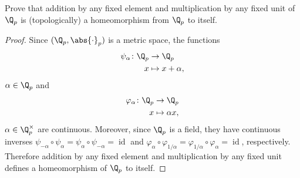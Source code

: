 \documentclass[10pt]{amsart}
\begin{document}
\setcounter{thm}{5}
\begin{thm}
  Prove that addition by any fixed element and multiplication by any fixed unit of $\Q_p$ is (topologically)
  a homeomorphism from $\Q_p$ to itself.
  \begin{proof}
    Since $(\Q_p, \abs{\cdot}_p)$ is a metric space, the functions 
    \begin{align*}
      \psi_\alpha \colon \Q_p &\rightarrow \Q_p\\
      x &\mapsto x + \alpha,
    \end{align*}
     $\alpha \in \Q_p$ and 
    \begin{align*}
      \varphi_\alpha \colon \Q_p &\rightarrow \Q_p\\
      x &\mapsto \alpha x,
    \end{align*}
    $\alpha \in \Q_p^\times$ are continuous.
    Moreover, since $\Q_p$ is a field, they have continuous inverses $\psi_{-\alpha} \circ \psi_{\alpha} = \psi_{\alpha} \circ \psi_{-\alpha} = \operatorname{id}$ and $\varphi_{\alpha} \circ \varphi_{1/\alpha} = \varphi_{1/\alpha} \circ \varphi_{\alpha} = \operatorname{id}$, respectively.
    Therefore addition by any fixed element and multiplication by any fixed unit defines a homeomorphism of $\Q_p$ to itself.
  \end{proof}
\end{thm}
\end{document}
